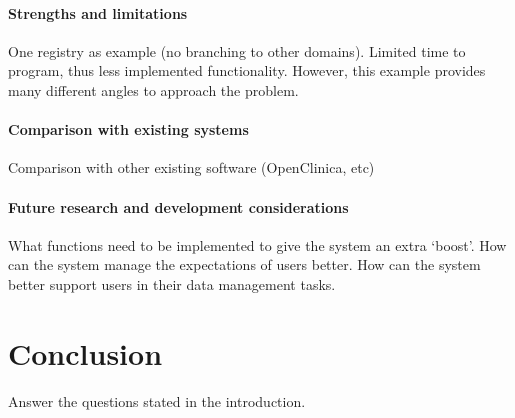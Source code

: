 \paragraph{Strengths and limitations}
One registry as example (no branching to other domains). 
Limited time to program, thus less implemented functionality.
However, this example provides many different angles to approach the problem.
\paragraph{Comparison with existing systems}
Comparison with other existing software (OpenClinica, etc)
\paragraph{Future research and development considerations}
What functions need to be implemented to give the system an extra `boost'.
How can the system manage the expectations of users better.
How can the system better support users in their data management tasks.

\section{Conclusion}
Answer the questions stated in the introduction.
